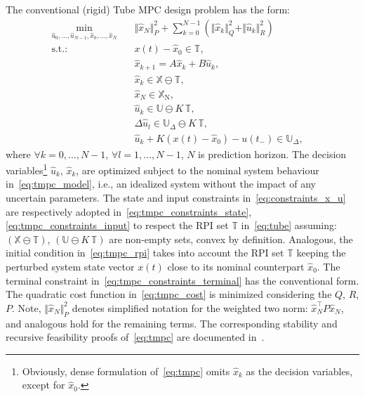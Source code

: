 \documentclass[letterpaper, 10 pt, conference]{ieeeconf}
\begin{document}
The conventional (rigid) Tube MPC design problem has the form:
\begin{subequations}
	\label{eq:tmpc}
	\begin{eqnarray}
		\label{eq:tmpc_cost}
		\min_{\hat{u}_{0},\ldots,\hat{u}_{N-1}, \hat{x}_{0},\ldots,\hat{x}_{N} } \!\!\!\!\!\!\!\!\!\!\! &\,& \Vert \hat{x}_{N} \Vert_{P}^{2} + \sum_{k=0}^{N-1} \left( \Vert \hat{x}_{k} \Vert_{Q}^{2} + \Vert \hat{u}_{k} \Vert_{R}^{2} \right) \qquad \\
		\label{eq:tmpc_rpi}
		\mathrm{s.t.\!:} &\,& x(t) - \hat{x}_{0} \in \mathbb{T} , \\
		\label{eq:tmpc_model}
		&\,&  \hat{x}_{k+1} = A \hat{x}_{k} + B \hat{u}_{k} , \\
		\label{eq:tmpc_constraints_state}
		&\,& \hat{x}_{k} \in \mathbb{X} \ominus \mathbb{T} , \\
		\label{eq:tmpc_constraints_terminal}
		&\,& \hat{x}_{N} \in \mathbb{X}_{\mathrm{N}}, \\
		\label{eq:tmpc_constraints_input}
		&\,& \hat{u}_{k} \in \mathbb{U} \ominus K \, \mathbb{T} , \\
		\label{eq:tmpc_constraints_input_delta_k}
		&\,& \Delta \hat{u}_{l} \in \mathbb{U}_{\Delta} \ominus K \, \mathbb{T} , \\
		\label{eq:tmpc_constraints_input_delta_0}
		&\,& \hat{u}_{k} + K ( x(t) - \hat{x}_{0} ) - u(t_{-}) \in \mathbb{U}_{\Delta} , \quad
	\end{eqnarray}
\end{subequations}
where $\forall k = 0, \dots, N-1$,  $\forall l = 1, \dots, N-1$, $N$ is prediction horizon.
The decision variables\footnote{Obviously, dense formulation of~\eqref{eq:tmpc} omits $\hat{x}_{k}$ as the decision variables, except for $\hat{x}_{0}$.} $\hat{u}_{k}$, $\hat{x}_{k}$, are optimized subject to the nominal system behaviour in~\eqref{eq:tmpc_model}, i.e., an idealized system without the impact of any uncertain parameters. The state and input constraints in~\eqref{eq:constraints_x_u} are respectively adopted in~\eqref{eq:tmpc_constraints_state}, \eqref{eq:tmpc_constraints_input} to respect the RPI set $\mathbb{T}$ in~\eqref{eq:tube} assuming: $(\mathbb{X} \ominus \mathbb{T})$, $(\mathbb{U} \ominus K \, \mathbb{T})$ are non-empty sets, convex by definition. Analogous, the initial condition in~\eqref{eq:tmpc_rpi} takes into account the RPI set $\mathbb{T}$ keeping the perturbed system state vector $x(t)$ close to its nominal counterpart $\hat{x}_{0}$. 
The terminal constraint in~\eqref{eq:tmpc_constraints_terminal} has the conventional form.
The quadratic cost function in~\eqref{eq:tmpc_cost} is minimized considering the $Q$, $R$, $P$. Note, $\Vert \hat{x}_{N} \Vert_{P}^{2}$ denotes simplified notation for the weighted two norm: $\hat{x}_{N}^{\top} P \hat{x}_{N}$, and analogous hold for the remaining terms. 
The corresponding stability and recursive feasibility proofs of~\eqref{eq:tmpc} are documented in~\cite{MS05}.
\end{document}
